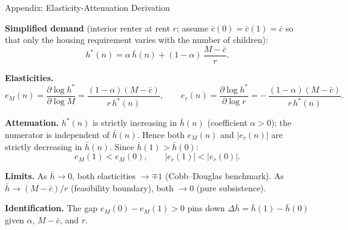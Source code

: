 \documentclass[11pt,aspectratio=169]{beamer}
\begin{document}
\begin{frame}{Appendix: Elasticity-Attenuation Derivation \; \hyperlink{slide1-main}{}}
\label{app:elasticity}
\footnotesize

\textbf{Simplified demand} (interior renter at rent $r$; assume $\bar c(0)=\bar c(1)=\bar c$ so that only the housing requirement varies with the number of children):
\[
h^\ast(n) = \alpha\,\bar h(n) + (1-\alpha)\,\frac{M-\bar c}{r}.
\]

\vspace{0.4em}
\textbf{Elasticities.}
\[
e_M(n) = \frac{\partial \log h^\ast}{\partial \log M}
= \frac{(1-\alpha)(M-\bar c)}{r\,h^\ast(n)},
\qquad
e_r(n) = \frac{\partial \log h^\ast}{\partial \log r}
= -\,\frac{(1-\alpha)(M-\bar c)}{r\,h^\ast(n)}.
\]

\vspace{0.4em}
\textbf{Attenuation.} $h^\ast(n)$ is strictly increasing in $\bar h(n)$
(coefficient $\alpha > 0$); the numerator is independent of $\bar h(n)$.
Hence both $e_M(n)$ and $|e_r(n)|$ are strictly decreasing in
$\bar h(n)$. Since $\bar h(1) > \bar h(0)$:
\[
e_M(1) < e_M(0),
\qquad
|e_r(1)| < |e_r(0)|.
\]

\vspace{0.4em}
\textbf{Limits.} As $\bar h \to 0$, both elasticities $\to \mp 1$
(Cobb--Douglas benchmark). As $\bar h \to (M-\bar c)/r$ (feasibility
boundary), both $\to 0$ (pure subsistence).

\vspace{0.4em}
\textbf{Identification.} The gap $e_M(0) - e_M(1) > 0$ pins down
	$\Delta\bar h = \bar h(1) - \bar h(0)$ given $\alpha$, $M-\bar c$, and $r$.
\end{frame}
\end{document}
